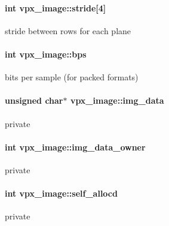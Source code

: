 \paragraph[{\texorpdfstring{stride}{stride}}]{\setlength{\rightskip}{0pt plus 5cm}int vpx\+\_\+image\+::stride\mbox{[}4\mbox{]}}\hypertarget{structvpx__image_ac9c7b83e3eea44cb680956f90dc789cf}{}\label{structvpx__image_ac9c7b83e3eea44cb680956f90dc789cf}
stride between rows for each plane 
\paragraph[{\texorpdfstring{bps}{bps}}]{\setlength{\rightskip}{0pt plus 5cm}int vpx\+\_\+image\+::bps}\hypertarget{structvpx__image_a53a02fad822151eb8eeb2f64f195e1f6}{}\label{structvpx__image_a53a02fad822151eb8eeb2f64f195e1f6}
bits per sample (for packed formats) 
\paragraph[{\texorpdfstring{img\+\_\+data}{img_data}}]{\setlength{\rightskip}{0pt plus 5cm}unsigned char$\ast$ vpx\+\_\+image\+::img\+\_\+data}\hypertarget{structvpx__image_a3c9b7a7a68e4a9665b47433a1e96d78b}{}\label{structvpx__image_a3c9b7a7a68e4a9665b47433a1e96d78b}
private 
\paragraph[{\texorpdfstring{img\+\_\+data\+\_\+owner}{img_data_owner}}]{\setlength{\rightskip}{0pt plus 5cm}int vpx\+\_\+image\+::img\+\_\+data\+\_\+owner}\hypertarget{structvpx__image_a4d2c8d41b67f7d3f3114212a8d8afdce}{}\label{structvpx__image_a4d2c8d41b67f7d3f3114212a8d8afdce}
private 
\paragraph[{\texorpdfstring{self\+\_\+allocd}{self_allocd}}]{\setlength{\rightskip}{0pt plus 5cm}int vpx\+\_\+image\+::self\+\_\+allocd}\hypertarget{structvpx__image_a33e8c75d8efc5d4f389e8fc09283a4cc}{}\label{structvpx__image_a33e8c75d8efc5d4f389e8fc09283a4cc}
private 
